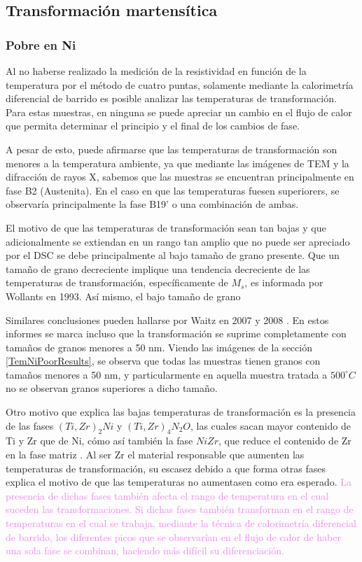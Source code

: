 \documentclass[12pt]{article}
\theoremstyle{definition}
\theoremstyle{remark}
\begin{document}
\subsection{Transformación martensítica}
\label{TransfomacionDiscusion}

\subsubsection{Pobre en Ni}
Al no haberse realizado la medición de la resistividad en función de la temperatura por el método de cuatro puntas, solamente mediante la calorimetría diferencial de barrido es posible analizar las temperaturas de transformación. Para estas muestras, en ninguna se puede apreciar un cambio en el flujo de calor que permita determinar el principio y el final de los cambios de fase.

A pesar de esto, puede afirmarse que las temperaturas de transformación son menores a la temperatura ambiente, ya que mediante las imágenes de TEM y la difracción de rayos X, sabemos que las muestras se encuentran principalmente en fase B2 (Austenita). En el caso en que las temperaturas fuesen superiorers, se observaría principalmente la fase B19' o una combinación de ambas.

El motivo de que las temperaturas de transformación sean tan bajas y que adicionalmente se extiendan en un rango tan amplio que no puede ser apreciado por el DSC se debe principalmente al bajo tamaño de grano presente. Que un tamaño de grano decreciente implique una tendencia decreciente de las temperaturas de transformación, específicamente de $M_s$, es informada por Wollants en 1993\cite{Wollants1993}. Así mismo, el bajo tamaño de grano

Similares conclusiones pueden hallarse por Waitz en 2007 y 2008 \cite{Waitz2007}\cite{Waitz2008}. En estos informes se marca incluso que la transformación se suprime completamente con tamaños de granos menores a 50 nm. Viendo las imágenes de la sección \ref{TemNiPoorResults}, se observa que todas las muestras tienen granos con tamaños menores a 50 nm, y particularmente en aquella muestra tratada a $500^\circ C$ no se observan granos superiores a dicho tamaño.

Otro motivo que explica las bajas temperaturas de transformación es la presencia de las fases $(Ti, Zr)_2 Ni$ y $(Ti, Zr)_4 N_2O$, las cuales sacan mayor contenido de Ti y Zr que de Ni, cómo así también la fase $NiZr$, que reduce el contenido de Zr en la fase matriz \cite{HeeYoungKim2009}. Al ser Zr el material responsable que aumenten las temperaturas de transformación, su escasez debido a que forma otras fases explica el motivo de que las temperaturas no aumentasen como era esperado. \textcolor{violet}{La presencia de dichas fases también afecta el rango de temperatura en el cual suceden las transformaciones. Si dichas fases también transforman en el rango de temperaturas en el cual se trabaja, mediante la técnica de calorimetría diferencial de barrido, los diferentes picos que se observarían en el flujo de calor de haber una sola fase se combinan, haciendo más difícil su diferenciación.}
\end{document}
